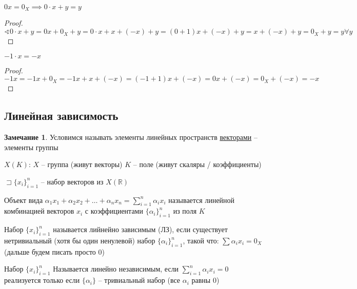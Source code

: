 \documentclass{book}
\newcommand\R{\ensuremath{\mathbb{R}}}
\theoremstyle{definition}
\newtheorem*{note}{Замечание}
\begin{document}
\begin{lemma}
    $0x = 0_X \implies 0\cdot x+y = y$
\end{lemma}
\begin{proof}
    $\sphericalangle 0\cdot x+y = 0x + 0_X + y = 0\cdot x + x + (-x) + y = (0+1)x + (-x) + y = x + (-x) + y = 0_X + y = y \forall y$
\end{proof}
\begin{lemma}
    $-1\cdot x = -x$
\end{lemma}
\begin{proof}
    $-1x = -1x + 0_X = -1x + x + (-x) = (-1+1)x + (-x) = 0x + (-x) = 0_X + (-x) = -x$
\end{proof}

\subsection{Линейная зависимость}

\begin{note}
    Условимся называть элементы линейных пространств \underline{векторами} -- элементы группы

    $X(K)$: $X$ -- группа (живут векторы)  $K$ -- поле (живут скаляры / коэффициенты)
\end{note}

$\sqsupset \{x_i\}_{i=1}^n$ -- набор векторов из $X(\R)$

\begin{definition}
    Объект вида $\alpha_1x_1 + \alpha_2x_2 + \ldots + \alpha_nx_{n}  = \sum_{i=1}^{n} \alpha_ix_i$ называется линейной комбинацией векторов $x_i$ с коэффициентами $\{\alpha_i\}_{i=1}^n$ из поля  $K$
\end{definition}

\begin{definition}
    Набор $\{x_i\}_{i=1}^n$ называется лийнейно зависимым (ЛЗ), если существует нетривиальный (хотя бы один ненулевой) набор  $\{\alpha_i\}_{i=1}^n$, такой что:  $\sum \alpha_ix_i = 0_X$ (дальше будем писать просто  $0$)
\end{definition}

\begin{definition}
    Набор $\{x_i\}_{i=1}^n$ Называется линейно независимым, если  $\sum_{i=1}^{n} \alpha_ix_i = 0$ реализуется только если $\{\alpha_i\}$ -- тривиальный набор (все  $\alpha_i$ равны  $0$)
\end{definition}
\end{document}
